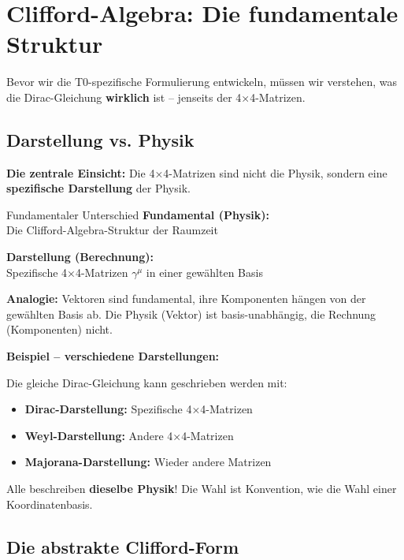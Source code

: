 \section{Clifford-Algebra: Die fundamentale Struktur}
\label{sec:clifford_fundamentals}

Bevor wir die T0-spezifische Formulierung entwickeln, müssen wir verstehen, was die 
Dirac-Gleichung \textbf{wirklich} ist – jenseits der 4×4-Matrizen.

\subsection{Darstellung vs. Physik}
\label{subsec:representation_vs_physics}

\textbf{Die zentrale Einsicht:} Die 4×4-Matrizen sind nicht die Physik, sondern eine 
\textbf{spezifische Darstellung} der Physik.

\begin{important}{Fundamentaler Unterschied}
	\textbf{Fundamental (Physik):} \\
	Die Clifford-Algebra-Struktur der Raumzeit
	
	\textbf{Darstellung (Berechnung):} \\
	Spezifische 4×4-Matrizen $\gamma^\mu$ in einer gewählten Basis
	
	\vspace{0.3cm}
	
	\textbf{Analogie:} Vektoren sind fundamental, ihre Komponenten hängen von der 
	gewählten Basis ab. Die Physik (Vektor) ist basis-unabhängig, die Rechnung 
	(Komponenten) nicht.
\end{important}

\textbf{Beispiel -- verschiedene Darstellungen:}

Die gleiche Dirac-Gleichung kann geschrieben werden mit:
\begin{itemize}
	\item \textbf{Dirac-Darstellung:} Spezifische 4×4-Matrizen
	\item \textbf{Weyl-Darstellung:} Andere 4×4-Matrizen
	\item \textbf{Majorana-Darstellung:} Wieder andere Matrizen
\end{itemize}

Alle beschreiben \textbf{dieselbe Physik}! Die Wahl ist Konvention, wie die Wahl 
einer Koordinatenbasis.

\subsection{Die abstrakte Clifford-Form}
\label{subsec:abstract_clifford}

